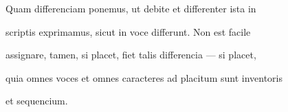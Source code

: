 Quam differenciam ponemus, ut debite et differenter ista in

scriptis exprimamus, sicut in voce differunt. Non est facile

assignare, tamen, si placet, fiet talis differencia — si placet,




\fullpreviouslines

{
\color{blue}
quia omnes voces et omnes caracteres ad placitum sunt inventoris

et sequencium.

}


\endinput






Non est facile

assignare, tamen, si placet, fiet talis differencia — si placet,

60:
eo \y rkp.: quantocius.


\catcode `\^^M=5

  \newtip{48}{Łoś niesłusznie uważa, że \textit{bika} w obu wypadkach
    napisano błędnie zamiast \textit{ƀyka}. Przykłady są bowiem podane
    w~pisowni dotychczasowej dla pokazania jej niewystarczalności do
    zróżnicowania wyrazów \textit{bika} i \textit{byka}.}

\obeylines




\newcommand{\margin}[1]{\annotatetextBlue{\{#1\}}{zapisy na marginesie}}



\renewcommand{\over}[1]{\annotatetextBlue{\{#1\}}{zapisy nad rządkami}}

\newcommand{\add}[1]{\annotatetextOlive{<#1>}{litery i wyrazy dodane, (których w tekście brak)}}

\newcommand{\extra}[1]{\colorbox{magenta!10}{[#1]}}

\newcommand{\overstr}[1]{\annotatetextMagenta{⟦#1⟧}{przekreślenia}}



